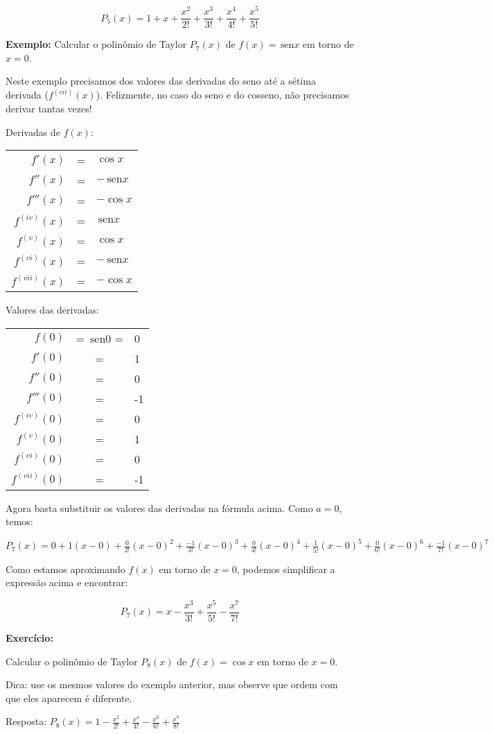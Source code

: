 \documentclass[a4paper]{article}
\providecommand{\sin}{} \renewcommand{\sin}{\hspace{2pt}\mathrm{sen}}
\begin{document}
\begin{displaymath}
  P_5(x) = 1+ x + \frac{x^2}{2!} + \frac{x^3}{3!} + \frac{x^4}{4!} + \frac{x^5}{5!}
\end{displaymath}

{\bf Exemplo:} Calcular o polinômio de Taylor $P_7(x)$ de $f(x)=\sin x$ em torno de $x=0$.

Neste exemplo precisamos dos valores das derivadas do seno até a sétima derivada ($f^{(vii)}(x)$).
Felizmente, no caso do seno e do cosseno, não precisamos derivar tantas vezes!

\begin{multicols}{2}

Derivadas de $f(x)$:

  \begin{tabular}{rcl}
    $f'(x)$ &=& $\cos x$\\
    $f''(x)$ &=& $-\sin x$\\
    $f'''(x)$ &=& $-\cos x$\\
    $f^{(iv)}(x)$ &=& $\sin x$\\
    $f^{(v)}(x)$ &=& $\cos x$\\
    $f^{(vi)}(x)$ &=& $-\sin x$\\
    $f^{(vii)}(x)$ &=& $-\cos x$\\
  \end{tabular}

  \columnbreak

Valores das derivadas:

  \begin{tabular}{rcl}
    $f(0)$ &= $\sin 0$ =& 0\\
    $f'(0)$ &=& 1\\
    $f''(0)$ &=& 0\\
    $f'''(0)$ &=& -1\\
    $f^{(iv)}(0)$ &=& 0\\
    $f^{(v)}(0)$ &=& 1\\
    $f^{(vi)}(0)$ &=& 0\\
    $f^{(vii)}(0)$ &=& -1\\
  \end{tabular}
\end{multicols}

Agora basta substituir os valores das derivadas na fórmula acima.
Como $a=0$, temos:

$P_7(x) = 0+ 1(x-0) + \frac{0}{2!}(x-0)^2 + \frac{-1}{3!}(x-0)^3 + \frac{0}{4!}(x-0)^4 + \frac{1}{5!}(x-0)^5 + \frac{0}{6!}(x-0)^6 + \frac{-1}{7!}(x-0)^7$

Como estamos aproximando $f(x)$ em torno de $x=0$, podemos simplificar a expressão acima e encontrar:

\begin{displaymath}
  P_7(x) = x  - \frac{x^3}{3!}  + \frac{x^5}{5!} - \frac{x^7}{7!}
\end{displaymath}

{\bf Exercício:}

Calcular o polinômio de Taylor $P_8(x)$ de $f(x)=\cos x$ em torno de $x=0$.

Dica: use os mesmos valores do exemplo anterior, mas observe que ordem com que eles aparecem é diferente.

Resposta: $P_8(x) = 1 - \frac{x^2}{2!}  + \frac{x^4}{4!} - \frac{x^6}{6!} + \frac{x^8}{8!}$
\end{document}
